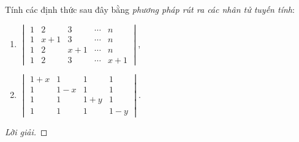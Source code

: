 \documentclass[class=linearalgebra,crop=false]{standalone}
\begin{document}
\begin{exercise}
    \par Tính các định thức sau đây bằng \textit{phương pháp rút ra các nhân tử tuyến tính}:
    \begin{enumerate}[label = (\alph*)]
        \item $\begin{vmatrix} 1 & 2 & 3 & \cdots & n \\ 1 & x + 1 & 3 & \cdots & n \\ 1 & 2 & x + 1 & \cdots & n \\ 1 & 2 & 3 & \cdots & x + 1 \end{vmatrix}$,
        \item $\begin{vmatrix} 1 + x & 1 & 1 & 1 \\ 1 & 1 - x & 1 & 1 \\ 1 & 1 & 1 + y & 1 \\ 1 & 1 & 1 & 1 - y \end{vmatrix}$.
    \end{enumerate}
\end{exercise}

\begin{proof}[Lời giải]
\end{proof}
\end{document}
